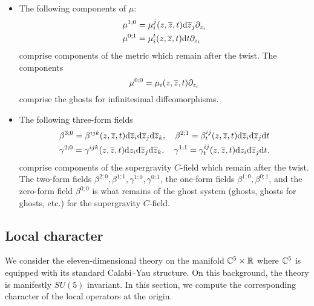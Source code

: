 \begin{itemize}
\item 
The following components of $\mu$:
\begin{align*}
\mu^{1;0} & = \mu^j_i(z,\overline{z},t) {\rm d} \overline{z}_j \partial_{z_i} \\
\mu^{0;1} & = \mu^t_i (z,\overline{z},t) {\rm d} t \partial_{z_i}
\end{align*}
comprise components of the metric which remain after the twist. 
The components 
\[
\mu^{0;0} = \mu_i (z,\overline{z},t) \partial_{z_i} 
\]
comprise the ghosts for infinitesimal diffeomorphisms. 
\item 
The following three-form fields
\begin{multline}
\beta^{3;0} = \beta^{ijk} (z,\overline{z},t) {\rm d} \overline{z}_i {\rm d} \overline{z}_j {\rm d} \overline{z}_k , \quad \beta^{2;1} = \beta^{ij}_t (z,\overline{z},t) {\rm d} \overline{z}_i {\rm d} \overline{z}_j {\rm d} t \\
\gamma^{2;0} = \gamma^{ijk} (z,\overline{z},t) {\rm d} z_i {\rm d} \overline{z}_j {\rm d} \overline{z}_k , \quad \gamma^{1;1} = \gamma^{ij}_t (z,\overline{z},t) {\rm d} z_i {\rm d} \overline{z}_j {\rm d} t .
\end{multline} 
comprise components of the supergravity $C$-field which remain after the twist. 
The two-form fields $\beta^{2;0}, \beta^{1;1}, \gamma^{1;0}, \gamma^{0;1}$, the one-form fields $\beta^{1;0}, \beta^{0;1}$, and the zero-form field $\beta^{0;0}$ is what remains of the ghost system (ghosts, ghosts for ghosts, etc.) for the supergravity $C$-field. 
\end{itemize}

\subsection{Local character}\label{sec:locchar}

We consider the eleven-dimensional theory on the manifold $\mathbb C^5 \times \mathbb R$ where $\mathbb C^5$ is equipped with its standard Calabi--Yau structure. 
On this background, the theory is manifestly $SU(5)$ invariant. 
In this section, we compute the corresponding character of the local operators at the origin. 

